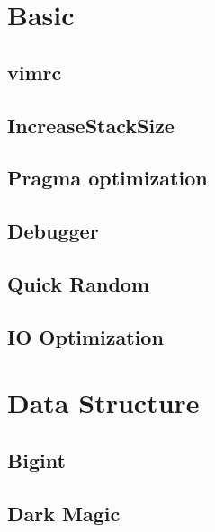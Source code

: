 \documentclass[a4paper,10pt,twocolumn,oneside]{article}
\begin{document}
\pagestyle{fancy}
\fancyfoot{}
\fancyhead[R]{\thepage}
\renewcommand{\headrulewidth}{0.4pt}
\renewcommand{\contentsname}{Contents} 

\scriptsize
\tableofcontents

\section{Basic}
\subsection{vimrc}

\subsection{IncreaseStackSize}

\subsection{Pragma optimization}

\subsection{Debugger}

\subsection{Quick Random}

\subsection{IO Optimization}


\section{Data Structure}
\subsection{Bigint}

\subsection{Dark Magic}

\end{document}
